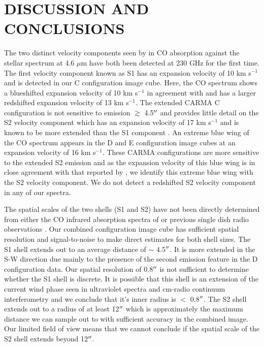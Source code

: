 \documentclass[preprint2]{aastex}
\begin{document}
\section{DISCUSSION AND CONCLUSIONS}

The two distinct velocity components seen by \cite{bern79} in CO absorption against the stellar spectrum at 4.6 $\mu$m have both been detected at 230 GHz for the first time. The first velocity component known as S1 has an expansion velocity of 10 km s${}^{-1}$ \citep{bern79} and is detected in our C configuration image cube. Here, the CO spectrum shows a blueshifted expansion velocity of 10 km s${}^{-1}$ in agreement with \cite{bern79} and has a larger redshifted expansion velocity of 13 km s${}^{-1}$. The extended CARMA C configuration is not sensitive to emission $\gtrsim$ 4.5$\mbox{$^{\prime\prime}$}$ and provides little detail on the S2 velocity component which has an expansion velocity of 17 km s${}^{-1}$ \citep{bern79} and is known to be more extended than the S1 component \citep{bern79, hugg86}. An extreme blue wing of the CO spectrum appears in the D and E configuration image cubes at an expansion velocity of 16 km s${}^{-1}$. These CARMA configurations are more sensitive to the extended S2 emission and as the expansion velocity of this blue wing is in close agreement with that reported by \cite{bern79}, we identify this extreme blue wing with the S2 velocity component. We do not detect a redshifted S2 velocity component in any of our spectra. 

The spatial scales of the two shells (S1 and S2) have not been directly determined from either the CO infrared absorption spectra of \cite{bern79} or previous single dish radio observations \citep{knap80, hugg86, hugg94}. Our combined configuration image cube has sufficient spatial resolution and signal-to-noise to make direct estimates for both shell sizes. The S1 shell extends out to an average distance of $\sim$ 4.5$\mbox{$^{\prime\prime}$}$. It is more extended in the S-W direction due mainly to the presence of the second emission feature in the D configuration data. Our spatial resolution of 0.8$\mbox{$^{\prime\prime}$}$ is not sufficient to determine whether the S1 shell is discrete. It is possible that this shell is an extension of the current wind phase seen in ultraviolet spectra \citep{carp97} and cm-radio continuum interferometry \citep{lim98, harp01} and we conclude that it's inner radius is $<$ 0.8$\mbox{$^{\prime\prime}$}$. The S2 shell extends out to a radius of at least 12$\mbox{$^{\prime\prime}$}$ which is approximately the maximum distance we can sample out to with sufficient accuracy in the combined image. Our limited field of view means that we cannot conclude if the spatial scale of the S2 shell extends beyond 12$\mbox{$^{\prime\prime}$}$. 
\end{document}

